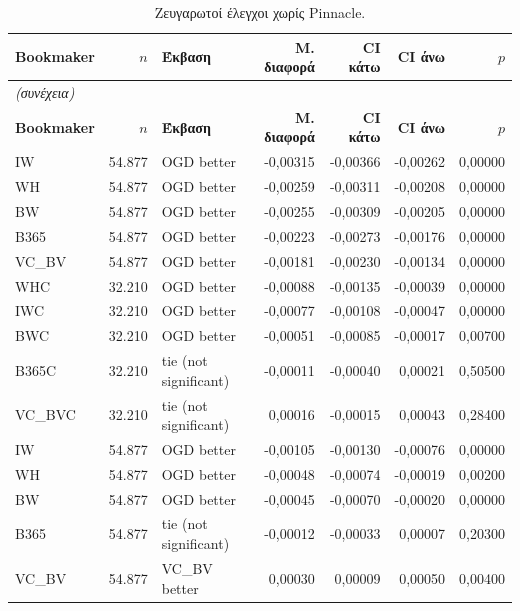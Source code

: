 {\footnotesize
\begin{longtable}{@{}lrlrrrr@{}}
\caption{Ζευγαρωτοί έλεγχοι χωρίς Pinnacle.}\label{app:npsig}\\
\toprule \textbf{Bookmaker} & \textbf{$n$} & \textbf{Έκβαση} & \textbf{Μ. διαφορά} & \textbf{CI κάτω} & \textbf{CI άνω} & \textbf{$p$} \\\midrule\endfirsthead
\multicolumn{7}{l}{\emph{(συνέχεια)}}\\\toprule \textbf{Bookmaker} & \textbf{$n$} & \textbf{Έκβαση} & \textbf{Μ. διαφορά} & \textbf{CI κάτω} & \textbf{CI άνω} & \textbf{$p$} \\\midrule\endhead
\bottomrule\endfoot
IW & 54.877 & OGD better & -0,00315 & -0,00366 & -0,00262 & 0,00000 \\
WH & 54.877 & OGD better & -0,00259 & -0,00311 & -0,00208 & 0,00000 \\
BW & 54.877 & OGD better & -0,00255 & -0,00309 & -0,00205 & 0,00000 \\
B365 & 54.877 & OGD better & -0,00223 & -0,00273 & -0,00176 & 0,00000 \\
VC\_BV & 54.877 & OGD better & -0,00181 & -0,00230 & -0,00134 & 0,00000 \\
WHC & 32.210 & OGD better & -0,00088 & -0,00135 & -0,00039 & 0,00000 \\
IWC & 32.210 & OGD better & -0,00077 & -0,00108 & -0,00047 & 0,00000 \\
BWC & 32.210 & OGD better & -0,00051 & -0,00085 & -0,00017 & 0,00700 \\
B365C & 32.210 & tie (not significant) & -0,00011 & -0,00040 & 0,00021 & 0,50500 \\
VC\_BVC & 32.210 & tie (not significant) & 0,00016 & -0,00015 & 0,00043 & 0,28400 \\
IW & 54.877 & OGD better & -0,00105 & -0,00130 & -0,00076 & 0,00000 \\
WH & 54.877 & OGD better & -0,00048 & -0,00074 & -0,00019 & 0,00200 \\
BW & 54.877 & OGD better & -0,00045 & -0,00070 & -0,00020 & 0,00000 \\
B365 & 54.877 & tie (not significant) & -0,00012 & -0,00033 & 0,00007 & 0,20300 \\
VC\_BV & 54.877 & VC\_BV better & 0,00030 & 0,00009 & 0,00050 & 0,00400 \\
\end{longtable}
}

